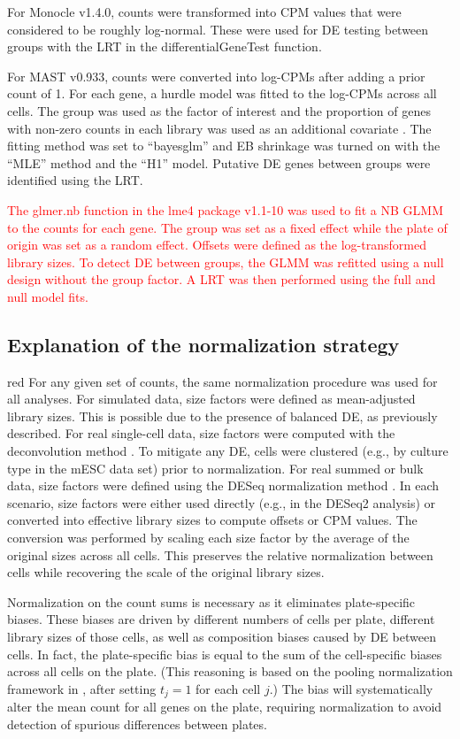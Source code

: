 \documentclass{article}
\newcommand\revised[1]{\textcolor{red}{#1}}
\begin{document}
For Monocle v1.4.0, counts were transformed into CPM values that were considered to be roughly log-normal.
These were used for DE testing between groups with the LRT in the differentialGeneTest function.

For MAST v0.933, counts were converted into log-CPMs after adding a prior count of 1.
For each gene, a hurdle model was fitted to the log-CPMs across all cells. 
The group was used as the factor of interest and the proportion of genes with non-zero counts in each library was used as an additional covariate \citep{finak2015mast}.
The fitting method was set to ``bayesglm'' and EB shrinkage was turned on with the ``MLE'' method and the ``H1'' model.
Putative DE genes between groups were identified using the LRT.

\revised{The glmer.nb function in the lme4 package v1.1-10 was used to fit a NB GLMM to the counts for each gene.
The group was set as a fixed effect while the plate of origin was set as a random effect.
Offsets were defined as the log-transformed library sizes.
To detect DE between groups, the GLMM was refitted using a null design without the group factor.
A LRT was then performed using the full and null model fits.}

\subsection{Explanation of the normalization strategy}
\begin{color}{red}
For any given set of counts, the same normalization procedure was used for all analyses.
For simulated data, size factors were defined as mean-adjusted library sizes.
This is possible due to the presence of balanced DE, as previously described.
For real single-cell data, size factors were computed with the deconvolution method \citep{lun2016pooling}.
To mitigate any DE, cells were clustered (e.g., by culture type in the mESC data set) prior to normalization.
For real summed or bulk data, size factors were defined using the DESeq normalization method \citep{anders2010differential}.
In each scenario, size factors were either used directly (e.g., in the DESeq2 analysis) or converted into effective library sizes to compute offsets or CPM values.
The conversion was performed by scaling each size factor by the average of the original sizes across all cells.
This preserves the relative normalization between cells while recovering the scale of the original library sizes.

Normalization on the count sums is necessary as it eliminates plate-specific biases.
These biases are driven by different numbers of cells per plate, different library sizes of those cells, as well as composition biases caused by DE between cells.
In fact, the plate-specific bias is equal to the sum of the cell-specific biases across all cells on the plate.
(This reasoning is based on the pooling normalization framework in \cite{lun2016pooling}, after setting $t_j=1$ for each cell $j$.)
The bias will systematically alter the mean count for all genes on the plate, requiring normalization to avoid detection of spurious differences between plates.
\end{color}
\end{document}
